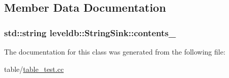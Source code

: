 \subsection{Member Data Documentation}
\hypertarget{classleveldb_1_1_string_sink_a1d0cf9c939de3e41d9c45df09297d1f3}{}
\subsubsection[{contents\+\_\+}]{\setlength{\rightskip}{0pt plus 5cm}std\+::string leveldb\+::\+String\+Sink\+::contents\+\_\+\hspace{0.3cm}{\ttfamily [private]}}\label{classleveldb_1_1_string_sink_a1d0cf9c939de3e41d9c45df09297d1f3}


The documentation for this class was generated from the following file\+:\begin{DoxyCompactItemize}
\item 
table/\hyperlink{table__test_8cc}{table\+\_\+test.\+cc}\end{DoxyCompactItemize}
